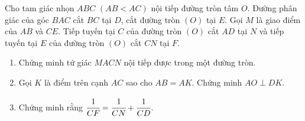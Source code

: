 	\begin{ex}%
	Cho tam giác nhọn $ABC$ $(AB<AC)$ nội tiếp đường tròn tâm $ O $. Đường phân giác của góc $ BAC $ cắt $ BC $ tại $ D $, cắt đường tròn $ (O) $ tại $ E $. Gọi $ M $ là giao điểm của $ AB $ và $ CE $. Tiếp tuyến tại $ C $ của đường tròn $ (O) $ cắt $ AD $ tại $ N $ và tiếp tuyến tại $ E $ của đường tròn $ (O) $ cắt $ CN $ tại $ F $.
	\begin{enumerate}
		\item Chứng minh tứ giác $MACN$ nội tiếp được trong một đường tròn.
		\item Gọi $ K $ là điểm trên cạnh $ AC $ sao cho $ AB=AK $. Chứng minh $ AO \perp DK $.
		\item Chứng minh rằng $ \cfrac{1}{CF}=\cfrac{1}{CN}+\cfrac{1}{CD} $.
	\end{enumerate}
	\loigiai
	{\begin{center}
\end{center}}
\end{ex}
